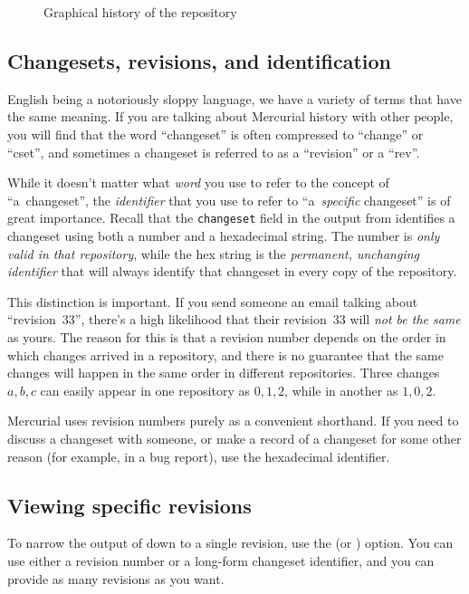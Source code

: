 \begin{figure}[ht]
  \centering
  \caption{Graphical history of the  repository}
  \label{fig:tour:history}
\end{figure}

\subsection{Changesets, revisions, and identification}

English being a notoriously sloppy language, we have a variety of
terms that have the same meaning.  If you are talking about Mercurial
history with other people, you will find that the word ``changeset''
is often compressed to ``change'' or ``cset'', and sometimes a
changeset is referred to as a ``revision'' or a ``rev''.

While it doesn't matter what \emph{word} you use to refer to the
concept of ``a~changeset'', the \emph{identifier} that you use to
refer to ``a~\emph{specific} changeset'' is of great importance.
Recall that the \texttt{changeset} field in the output from
 identifies a changeset using both a number and a
hexadecimal string.  The number is \emph{only valid in that
  repository}, while the hex string is the \emph{permanent, unchanging
  identifier} that will always identify that changeset in every copy
of the repository.

This distinction is important.  If you send someone an email talking
about ``revision~33'', there's a high likelihood that their
revision~33 will \emph{not be the same} as yours.  The reason for this
is that a revision number depends on the order in which changes
arrived in a repository, and there is no guarantee that the same
changes will happen in the same order in different repositories.
Three changes $a,b,c$ can easily appear in one repository as $0,1,2$,
while in another as $1,0,2$.

Mercurial uses revision numbers purely as a convenient shorthand.  If
you need to discuss a changeset with someone, or make a record of a
changeset for some other reason (for example, in a bug report), use
the hexadecimal identifier.

\subsection{Viewing specific revisions}

To narrow the output of  down to a single revision, use the
 (or ) option.  You can use either a
revision number or a long-form changeset identifier, and you can
provide as many revisions as you want.  


